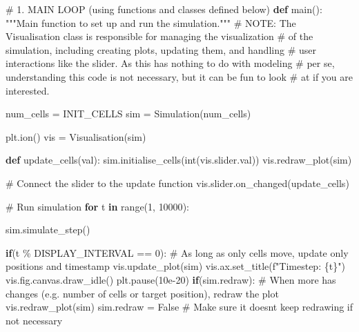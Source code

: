 \documentclass[
  letterpaper,
  DIV=11,
  numbers=noendperiod]{scrreprt}
\newenvironment{Shaded}{\begin{snugshade}}{\end{snugshade}}
\newcommand{\AlertTok}[1]{\textcolor[rgb]{0.68,0.00,0.00}{#1}}
\newcommand{\BuiltInTok}[1]{\textcolor[rgb]{0.00,0.23,0.31}{#1}}
\newcommand{\CommentTok}[1]{\textcolor[rgb]{0.37,0.37,0.37}{#1}}
\newcommand{\ControlFlowTok}[1]{\textcolor[rgb]{0.00,0.23,0.31}{\textbf{#1}}}
\newcommand{\DecValTok}[1]{\textcolor[rgb]{0.68,0.00,0.00}{#1}}
\newcommand{\FloatTok}[1]{\textcolor[rgb]{0.68,0.00,0.00}{#1}}
\newcommand{\KeywordTok}[1]{\textcolor[rgb]{0.00,0.23,0.31}{\textbf{#1}}}
\newcommand{\NormalTok}[1]{\textcolor[rgb]{0.00,0.23,0.31}{#1}}
\newcommand{\OperatorTok}[1]{\textcolor[rgb]{0.37,0.37,0.37}{#1}}
\newcommand{\SpecialCharTok}[1]{\textcolor[rgb]{0.37,0.37,0.37}{#1}}
\newcommand{\SpecialStringTok}[1]{\textcolor[rgb]{0.13,0.47,0.30}{#1}}
\newcommand{\VariableTok}[1]{\textcolor[rgb]{0.07,0.07,0.07}{#1}}
\theoremstyle{definition}
\theoremstyle{remark}
\begin{document}
\begin{tcolorbox}
\begin{Shaded}
\begin{Highlighting}[]
\CommentTok{\# 1. MAIN LOOP (using functions and classes defined below)}
\KeywordTok{def}\NormalTok{ main():}
    \CommentTok{"""Main function to set up and run the simulation."""}
    \CommentTok{\# }\AlertTok{NOTE}\CommentTok{: The \textasciigrave{}Visualisation\textasciigrave{} class is responsible for managing the visualization }
    \CommentTok{\# of the simulation, including creating plots, updating them, and handling }
    \CommentTok{\# user interactions like the slider. As this has nothing to do with modeling}
    \CommentTok{\# per se, understanding this code is not necessary, but it can be fun to look}
    \CommentTok{\# at if you are interested. }
    
\NormalTok{    num\_cells }\OperatorTok{=}\NormalTok{ INIT\_CELLS}
\NormalTok{    sim }\OperatorTok{=}\NormalTok{ Simulation(num\_cells) }

\NormalTok{    plt.ion()}
\NormalTok{    vis }\OperatorTok{=}\NormalTok{ Visualisation(sim)}

    \KeywordTok{def}\NormalTok{ update\_cells(val):}
\NormalTok{        sim.initialise\_cells(}\BuiltInTok{int}\NormalTok{(vis.slider.val))}
\NormalTok{        vis.redraw\_plot(sim)}
        
    \CommentTok{\# Connect the slider to the update function}
\NormalTok{    vis.slider.on\_changed(update\_cells)}

    \CommentTok{\# Run simulation}
    \ControlFlowTok{for}\NormalTok{ t }\KeywordTok{in} \BuiltInTok{range}\NormalTok{(}\DecValTok{1}\NormalTok{, }\DecValTok{10000}\NormalTok{):}
        
\NormalTok{        sim.simulate\_step()}
        
        \ControlFlowTok{if}\NormalTok{(t }\OperatorTok{\%}\NormalTok{ DISPLAY\_INTERVAL }\OperatorTok{==} \DecValTok{0}\NormalTok{):}
            \CommentTok{\# As long as only cells move, update only positions and timestamp}
\NormalTok{            vis.update\_plot(sim) }
\NormalTok{            vis.ax.set\_title(}\SpecialStringTok{f"Timestep: }\SpecialCharTok{\{}\NormalTok{t}\SpecialCharTok{\}}\SpecialStringTok{"}\NormalTok{)}
\NormalTok{            vis.fig.canvas.draw\_idle()}
\NormalTok{            plt.pause(}\FloatTok{10e{-}20}\NormalTok{)        }
        \ControlFlowTok{if}\NormalTok{(sim.redraw):}
            \CommentTok{\# When more has changes (e.g. number of cells or target position), redraw the plot}
\NormalTok{            vis.redraw\_plot(sim) }
\NormalTok{            sim.redraw }\OperatorTok{=} \VariableTok{False} \CommentTok{\# Make sure it doesn\textquotesingle{}t keep redrawing if not necessary}
        


\end{Highlighting}
\end{Shaded}
\end{tcolorbox}
\end{document}
